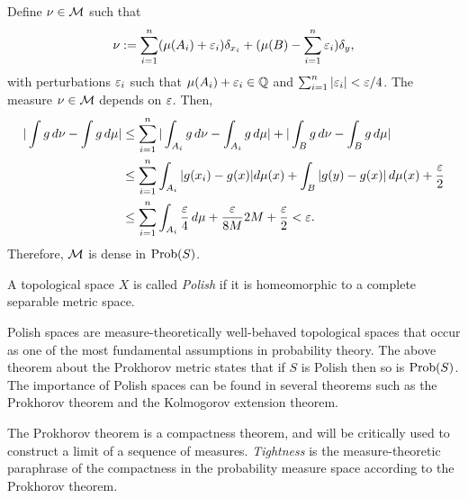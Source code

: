 \documentclass{../../small}
\begin{document}
\begin{pf}
Define $\nu\in\mathcal{M}$ such that
\[\nu:=\sum_{i=1}^n(\mu(A_i)+\varepsilon_i)\delta_{x_i}+(\mu(B)-\sum_{i=1}^n\varepsilon_i)\delta_y,\]
with perturbations $\varepsilon_i$ such that $\mu(A_i)+\varepsilon_i\in\mathbb{Q}$ and $\sum_{i=1}^n|\varepsilon_i|<\varepsilon/4$.
The measure $\nu\in\mathcal{M}$ depends on $\varepsilon$.
Then,
\begin{align*}
|\int g\,d\nu-\int g\,d\mu|
&\le\sum_{i=1}^n|\int_{A_i}g\,d\nu-\int_{A_i}g\,d\mu|+|\int_Bg\,d\nu-\int_Bg\,d\mu|\\
&\le\sum_{i=1}^n\int_{A_i}|g(x_i)-g(x)|d\mu(x)+\int_B|g(y)-g(x)|\,d\mu(x)+\frac{\varepsilon}2\\
&\le\sum_{i=1}^n\int_{A_i}\frac{\varepsilon}4\,d\mu+\frac{\varepsilon}{8M}2M+\frac{\varepsilon}2<\varepsilon.
\end{align*}
Therefore, $\mathcal{M}$ is dense in $\operatorname{Prob}(S)$.
\end{pf}

\begin{defn}
A topological space $X$ is called \emph{Polish} if it is homeomorphic to a complete separable metric space.
\end{defn}

Polish spaces are measure-theoretically well-behaved topological spaces that occur as one of the most fundamental assumptions in probability theory.
The above theorem about the Prokhorov metric states that if $S$ is Polish then so is $\operatorname{Prob}(S)$.
The importance of Polish spaces can be found in several theorems such as the Prokhorov theorem and the Kolmogorov extension theorem.

The Prokhorov theorem is a compactness theorem, and will be critically used to construct a limit of a sequence of measures.
\emph{Tightness} is the measure-theoretic paraphrase of the compactness in the probability measure space according to the Prokhorov theorem.
\end{document}
